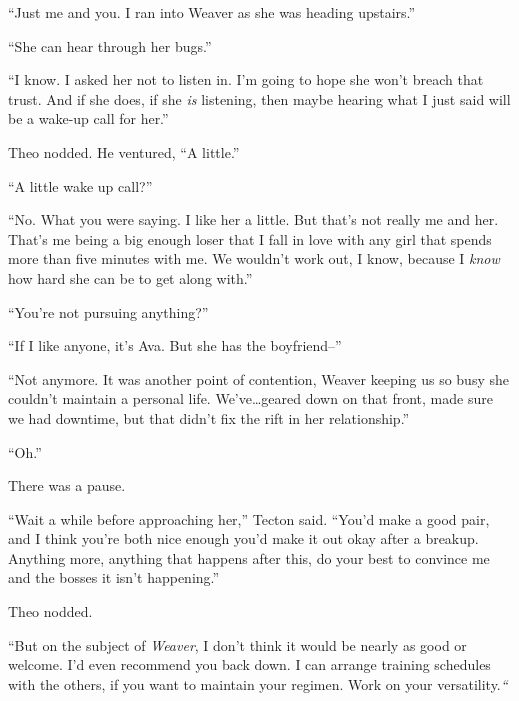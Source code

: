 ``Just me and you.  I ran into Weaver as she was heading upstairs.''



``She can hear through her bugs.''



``I know.  I asked her not to listen in.  I'm going to hope she won't breach that trust.  And if she does, if she \emph{is} listening, then maybe hearing what I just said will be a wake-up call for her.''



Theo nodded.  He ventured, ``A little.''



``A little wake up call?''



``No.  What you were saying.  I like her a little.  But that's not really me and her.  That's me being a big enough loser that I fall in love with any girl that spends more than five minutes with me.  We wouldn't work out, I know, because I \emph{know} how hard she can be to get along with.''



``You're not pursuing anything?''



``If I like anyone, it's Ava.  But she has the boyfriend--''



``Not anymore.  It was another point of contention, Weaver keeping us so busy she couldn't maintain a personal life.  We've\ldots geared down on that front, made sure we had downtime, but that didn't fix the rift in her relationship.''



``Oh.''



There was a pause.



``Wait a while before approaching her,'' Tecton said.  ``You'd make a good pair, and I think you're both nice enough you'd make it out okay after a breakup.  Anything more, anything that happens after this, do your best to convince me and the bosses it isn't happening.''



Theo nodded.



``But on the subject of \emph{Weaver}, I don't think it would be nearly as good or welcome.  I'd even recommend you back down.  I can arrange training schedules with the others, if you want to maintain your regimen.  Work on your versatility.\emph{``}



